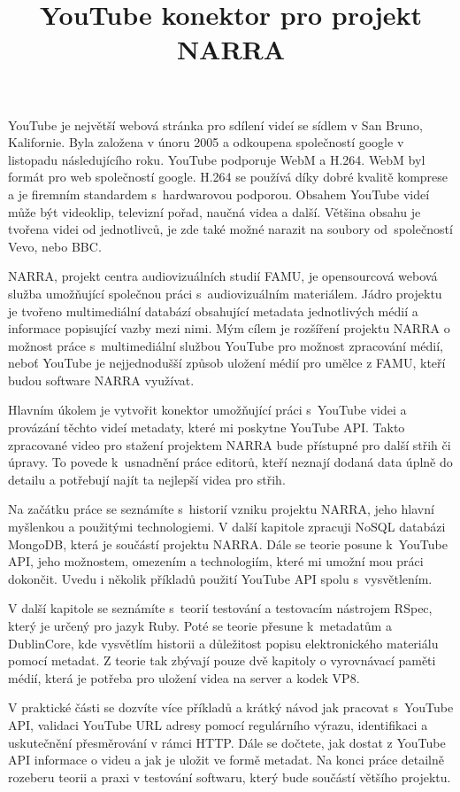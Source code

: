\documentclass[thesis=B,czech]{FITthesis}[2012/06/26]
\title{YouTube konektor pro projekt NARRA}
\begin{document}

\begin{introduction}
\par YouTube\cite{yout} je největší webová stránka pro sdílení videí se sídlem v San Bruno, Kalifornie. Byla založena v únoru 2005 a odkoupena společností google v listopadu následujícího roku. YouTube podporuje WebM a H.264. WebM byl formát pro web společností google. H.264 se používá díky dobré kvalitě komprese a je firemním standardem s~hardwarovou podporou. Obsahem YouTube videí může být videoklip, televizní pořad, naučná videa a další. Většina obsahu je tvořena videi od jednotlivců, je zde také možné narazit na soubory od~společností Vevo, nebo BBC.
\par NARRA, projekt centra audiovizuálních studií FAMU, je opensourcová webová služba umožňující společnou práci s~audiovizuálním materiálem. Jádro projektu je tvořeno multimediální databází obsahující metadata jednotlivých médií a informace popisující vazby mezi nimi. Mým cílem je rozšíření projektu NARRA o možnost práce s~multimediální službou YouTube pro možnost zpracování médií, neboť YouTube je nejjednodušší způsob uložení médií pro umělce z FAMU, kteří budou software NARRA využívat.
\par Hlavním úkolem je vytvořit konektor umožňující práci s~YouTube videi a provázání těchto videí metadaty, které mi poskytne YouTube API. Takto zpracované video pro stažení projektem NARRA bude přístupné pro další střih či úpravy. To povede k~usnadnění práce editorů, kteří neznají dodaná data úplně do detailu a potřebují najít ta nejlepší videa pro střih. 
\par Na začátku práce se seznámíte s~historií vzniku projektu NARRA, jeho hlavní myšlenkou a použitými technologiemi. V další kapitole zpracuji NoSQL databázi MongoDB, která je součástí projektu NARRA. Dále se teorie posune k~YouTube API, jeho možnostem, omezením a technologiím, které mi umožní mou práci dokončit. Uvedu i několik příkladů použití YouTube API spolu s~vysvětlením.
\par V další kapitole se seznámíte s~teorií testování a testovacím nástrojem RSpec, který je určený pro jazyk Ruby. Poté se teorie přesune k~metadatům a DublinCore, kde vysvětlím historii a důležitost popisu elektronického materiálu pomocí metadat. Z teorie tak zbývají pouze dvě kapitoly o vyrovnávací paměti médií, která je potřeba pro uložení videa na server a kodek VP8.
\par V praktické části se dozvíte více příkladů a krátký návod jak pracovat s~YouTube API, validaci YouTube URL adresy pomocí regulárního výrazu, identifikaci a uskutečnění přesměrování v rámci HTTP. Dále se dočtete, jak dostat z YouTube API informace o videu a jak je uložit ve formě metadat. Na konci práce detailně rozeberu teorii a praxi v testování softwaru, který bude součástí většího projektu.
\end{introduction}
\end{document}
